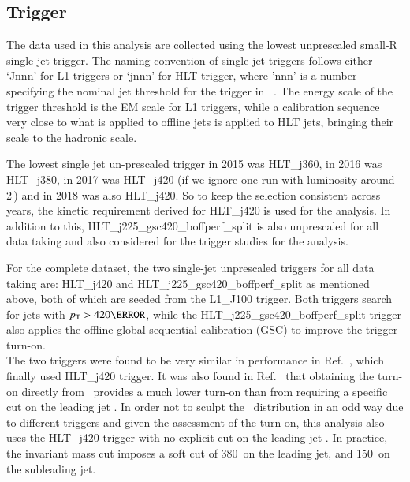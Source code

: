 \subsection{Trigger}
\label{sec:trigger}
The data used in this analysis are collected using the lowest
unprescaled small-R single-jet trigger.  The naming convention of
single-jet triggers follows either `Jnnn' for L1 triggers or `jnnn' for
HLT trigger, where 'nnn' is a number specifying the nominal jet \pT
threshold for the trigger in \GeV\ .  The energy scale of the trigger
threshold is the EM scale for L1 triggers, while a calibration sequence
very close to what is applied to offline jets is applied to HLT jets,
bringing their scale to the hadronic scale.

The lowest single jet un-prescaled trigger in 2015 was HLT\_j360, in
2016 was HLT\_j380, in 2017 was HLT\_j420 (if we ignore one run with
luminosity around 2\,\ipb ) and in 2018 was also HLT\_j420. So to keep
the selection consistent across years, the kinetic requirement derived
for HLT\_j420 is used for the analysis. In addition to this,
HLT\_j225\_gsc420\_boffperf\_split is also unprescaled for all data
taking and also considered for the trigger studies for the analysis.

For the complete \RunTwo dataset, the two single-jet unprescaled
triggers for all data taking are: HLT\_j420 and
HLT\_j225\_gsc420\_boffperf\_split as mentioned above, both of which are
seeded from the L1\_J100 trigger. Both triggers search for jets with
$\pT > 420 \GeV$, while the HLT\_j225\_gsc420\_boffperf\_split trigger
also applies the offline global sequential calibration (GSC) to improve
the trigger turn-on.\\

The two triggers were found to be very similar in
performance in Ref.~\cite{Nishu:2646455}, which finally used HLT\_j420 trigger.
It was also found in Ref.~\cite{Nishu:2646455} that obtaining the turn-on directly from \mjj\ provides a much
lower turn-on than from requiring a specific cut on the leading jet \pT.
In order not to sculpt the \mjj\ distribution in an odd way due to
different triggers and given the assessment of the turn-on, this analysis also
uses the HLT\_j420 trigger with no explicit cut on the leading jet \pT.
In practice, the invariant mass cut imposes a soft cut of 380~\GeV on 
the leading jet, and 150~\GeV on the subleading jet. 

